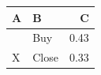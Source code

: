 \documentclass{article}
\begin{document}
\begin{tabular}{llr}
\hline
A & B & C \\
\hline
&Buy & 0.43 \\
X &Close & 0.33 \\
\end{tabular}
\end{document}
